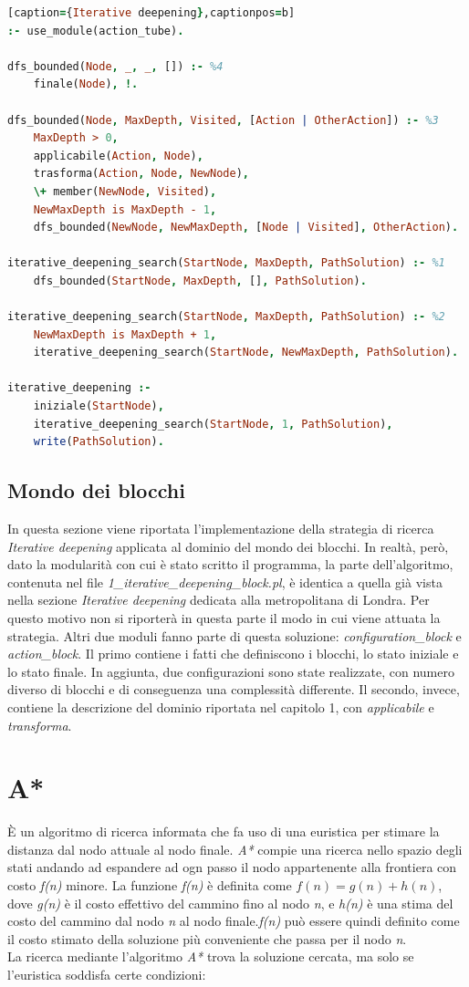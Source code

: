 \documentclass[12pt]{report}
\begin{document}
\begin{lstlisting}[language=Prolog][caption={Iterative deepening},captionpos=b]
:- use_module(action_tube).

dfs_bounded(Node, _, _, []) :- %4
	finale(Node), !.

dfs_bounded(Node, MaxDepth, Visited, [Action | OtherAction]) :- %3
	MaxDepth > 0,
	applicabile(Action, Node),
	trasforma(Action, Node, NewNode),
	\+ member(NewNode, Visited),
	NewMaxDepth is MaxDepth - 1,
	dfs_bounded(NewNode, NewMaxDepth, [Node | Visited], OtherAction).

iterative_deepening_search(StartNode, MaxDepth, PathSolution) :- %1
	dfs_bounded(StartNode, MaxDepth, [], PathSolution).

iterative_deepening_search(StartNode, MaxDepth, PathSolution) :- %2
	NewMaxDepth is MaxDepth + 1,
	iterative_deepening_search(StartNode, NewMaxDepth, PathSolution).

iterative_deepening :-
	iniziale(StartNode),
	iterative_deepening_search(StartNode, 1, PathSolution),
	write(PathSolution).
\end{lstlisting}

\subsection{Mondo dei blocchi}
In questa sezione viene riportata l'implementazione della strategia di ricerca \emph{Iterative deepening} applicata al dominio del mondo dei blocchi.
In realtà, però, dato la modularità con cui è stato scritto il programma, la parte dell'algoritmo, contenuta nel file \emph{1\_iterative\_deepening\_block.pl}, è identica a quella già vista nella sezione \emph{Iterative deepening} dedicata alla metropolitana di Londra. Per questo motivo non si riporterà in questa parte il modo in cui viene attuata la strategia.
Altri due moduli fanno parte di questa soluzione: \emph{configuration\_block} e \emph{action\_block}. Il primo contiene i fatti che definiscono i blocchi, lo stato iniziale e lo stato finale. In aggiunta, due configurazioni sono state realizzate, con numero diverso di blocchi e di conseguenza una complessità differente. Il secondo, invece, contiene la descrizione del dominio riportata nel capitolo 1, con \emph{applicabile} e \emph{transforma}.

\section{A*}
\`E un algoritmo di ricerca informata che fa uso di una euristica per stimare la distanza dal nodo attuale al nodo finale.
\emph{A*} compie una ricerca nello spazio degli stati andando ad espandere ad ogn passo il nodo appartenente alla frontiera con costo \emph{f(n)} minore. La funzione \emph{f(n)} è definita come $f(n) = g(n) + h(n)$, dove \emph{g(n)} è il costo effettivo del cammino fino al nodo \emph{n}, e \emph{h(n)} è una stima del costo del cammino dal nodo \emph{n} al nodo finale.\emph{f(n)} può essere quindi definito come il costo stimato della soluzione più conveniente che passa per il nodo \emph{n}.\\
La ricerca mediante l'algoritmo \emph{A*} trova la soluzione cercata, ma solo se l'euristica soddisfa certe condizioni:
\end{document}
